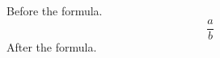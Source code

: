 \documentclass{article}
\begin{document}
Before the formula.
\[
\frac{a}{b}
\]
After the formula.
\end{document}
